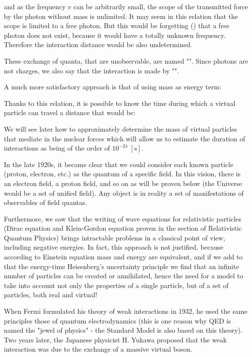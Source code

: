 	and as the frequency $v$ can be arbitrarily small, the scope of the transmitted force by the photon without mass is unlimited. It may seem in this relation that the scope is limited to a free photon. But this would be forgetting () that a free photon does not exist, because it would have a totally unknown frequency. Therefore the interaction distance would be also undetermined.
	
	These exchange of quanta, that are unobservable, are named "". Since photons are not charges, we also say that the interaction is made by "".
	
	A much more satisfactory approach is that of using mass as energy term:
	
	Thanks to this relation, it is possible to know the time during which a virtual particle can travel a distance that would be:
	
	We will see later how to approximately determine the mass of virtual particles that mediate in the nuclear forces which will allow us to estimate the duration of interactions as being of the order of $10^{-24}\; [\text{s}]$.
	
	In the late 1920s, it became clear that we could consider each known particle (proton, electron, etc.) as the quantum of a specific field. In this vision, there is an electron field, a proton field, and so on as will be proven below (the Universe would be a set of unified field). Any object is in reality a set of manifestations of observables of field quantas.
	
	Furthermore, we saw that the writing of wave equations for relativistic particles (Dirac equation and Klein-Gordon equation proven in the section of Relativistic Quantum Physics) brings intractable problems in a classical point of view, including negative energies. In fact, this approach is not justified, because according to Einstein equation mass and energy are equivalent, and if we add to that the energy-time Heisenberg's uncertainty principle we find that an infinite number of particles can be created or annihilated, hence the need for a model to take into account not only the properties of a single particle, but of a set of particles, both real and virtual!
	\begin{tcolorbox}[title=Remark,colframe=black,arc=10pt]
	When Fermi formulated his theory of weak interactions in 1932, he used the same principles those of quantum electrodynamics (this is one reason why QED is named the "jewel of physics" - the Standard Model is also based on this theory). Two years later, the Japanese physicist H. Yukawa proposed that the weak interaction was due to the exchange of a massive virtual boson.
	\end{tcolorbox}
	
